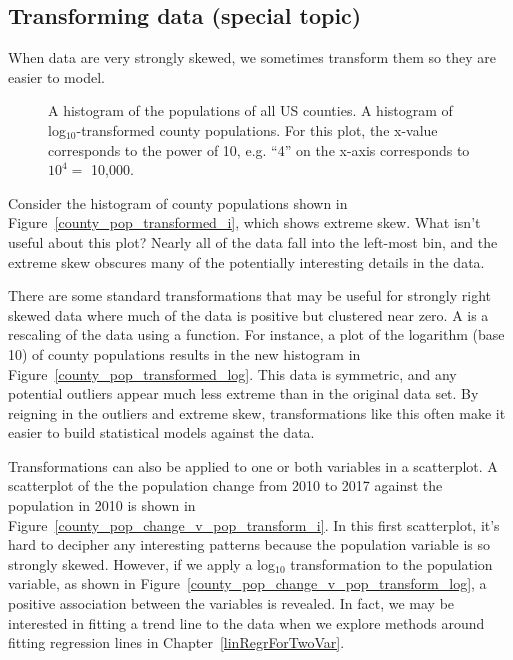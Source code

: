 

\subsection{Transforming data (special topic)}
\label{transformingDataSubsection}

\noindent%
When data are very strongly skewed, we sometimes transform
them so they are easier to model.

\begin{figure}[ht]
  \centering
  \caption{ A histogram of
      the populations of all US counties.
       A histogram of
      log$_{10}$-transformed county populations.
      For this plot, the x-value corresponds to the power
      of 10, e.g. ``4'' on the x-axis corresponds to
      $10^4 =$ 10,000.}
    \label{county_pop_transformed}
\end{figure}

\begin{examplewrap}
\begin{nexample}{Consider the histogram of county populations
    shown in Figure~\ref{county_pop_transformed_i},
    which shows extreme skew.
    What isn't useful about this plot?}
  Nearly all of the data fall into the left-most bin,
  and the extreme skew obscures many of the potentially
  interesting details in the data.
\end{nexample}
\end{examplewrap}

There are some standard transformations that may be
useful for strongly right skewed data where much of the
data is positive but clustered near zero.
A  is a rescaling of the data
using a function.
For instance, a plot of the logarithm (base 10) of
county populations results in the new histogram in
Figure~\ref{county_pop_transformed_log}.
This data is symmetric, and any potential outliers
appear much less extreme than in the original data set.
By reigning in the outliers and extreme skew,
transformations like this often make it easier to build
statistical models against the data.

Transformations can also be applied to one or both
variables in a scatterplot.
A scatterplot of the the population change from 2010 to 2017
against the population in 2010 is shown in Figure~\ref{county_pop_change_v_pop_transform_i}.
In this first scatterplot, it's hard to decipher any
interesting patterns because the population variable
is so strongly skewed.
However, if we apply a log$_{10}$ transformation to
the population variable, as shown in
Figure~\ref{county_pop_change_v_pop_transform_log},
a positive association between the variables is revealed.
In fact, we may be interested in fitting a trend line to
the data when we explore methods around fitting regression
lines in Chapter~\ref{linRegrForTwoVar}.

